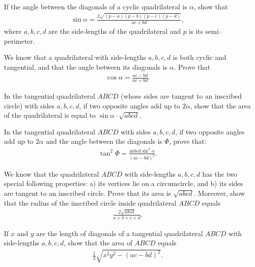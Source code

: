 \documentclass[12pt,a4paper]{memoir}
\theoremstyle{definition}
\begin{document}
\begin{question}
	If the angle between the diagonals of a cyclic quadrilateral is $\alpha$, show that
	\begin{align*}
		\sin \alpha = \frac{2\sqrt{(p-a)(p-b)(p-c)(p-d)}}{ac+bd},
	\end{align*}
	where $a,b,c,d$ are the side-lengths of the quadrilateral and $p$ is its semi--perimeter.
\end{question}

\begin{question}
	We know that a quadrilateral with side-lengths $a,b,c,d$ is both cyclic and tangential, and that the angle between its diagonals is $\alpha$. Prove that
	\begin{align*}
		\cos \alpha = \frac{ac-bd}{ac+bd}.
	\end{align*}
\end{question}


\begin{question}
	In the tangential quadrilateral $ABCD$ (whose sides are tangent to an inscribed circle) with sides $a,b,c,d$, if two opposite angles add up to $2\alpha$, show that the area of the quadrilateral is equal to $\sin \alpha \cdot\sqrt{abcd}$.
\end{question}


\begin{question}
	In the tangential quadrilateral $ABCD$ with sides $a,b,c,d$, if two opposite angles add up to $2\alpha$ and the angle between the diagonals is $\Phi$, prove that:
	\begin{align*}
		\tan^2 \Phi = \frac{4abcd\sin^2 \alpha}{(ac-bd)^2}.
	\end{align*}
\end{question}

\begin{question}
	We know that the quadrilateral $ABCD$ with side-lengths $a,b,c,d$ has the two special following properties: a) its vertices lie on a circumcircle, and b) its sides are tangent to an inscribed circle. Prove that its area is $\sqrt{abcd}$. Moreover, show that the radius of the inscribed circle inside quadrilateral $ABCD$ equals
	\begin{align*}
		\frac{2\sqrt{abcd}}{a+b+c+d}.
	\end{align*}
\end{question}


\begin{question}
	If $x$ and $y$ are the length of diagonals of a tangential quadrilateral $ABCD$ with side-lengths $a,b,c,d$, show that the area of $ABCD$ equals
	\begin{align*}
		\frac{1}{2}\sqrt{x^2y^2 - (ac-bd)^2}.
	\end{align*}
\end{question}
\end{document}
